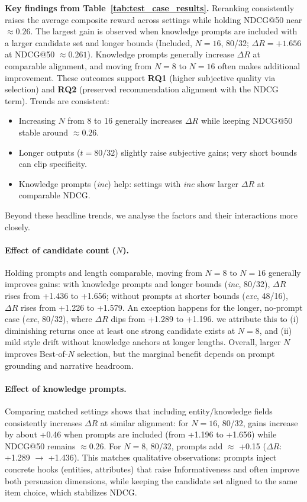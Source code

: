 \documentclass[12pt]{article}
\begin{document}
  \noindent\textbf{Key findings from Table~\ref{tab:test_case_results}.} Reranking consistently raises the average composite reward across settings while holding NDCG@50 near \(\approx 0.26\). The largest gain is observed when knowledge prompts are included with a larger candidate set and longer bounds (Included, $N=16$, 80/32; $\Delta R=+1.656$ at NDCG@50 \(\approx 0.261\)). Knowledge prompts generally increase \(\Delta R\) at comparable alignment, and moving from $N=8$ to $N=16$ often makes additional improvement. These outcomes support \textbf{RQ1} (higher subjective quality via selection) and \textbf{RQ2} (preserved recommendation alignment with the NDCG term).
  \newline
  \newline
  Trends are consistent:
  \begin{itemize}[leftmargin=*]
    \item Increasing $N$ from 8 to 16 generally increases \(\Delta R\) while keeping NDCG@50 stable around \(\approx 0.26\).
    \item Longer outputs ($t=80/32$) slightly raise subjective gains; very short bounds can clip specificity.
    \item Knowledge prompts (\textit{inc}) help: settings with \textit{inc} show larger \(\Delta R\) at comparable NDCG.
  \end{itemize}

  Beyond these headline trends, we analyse the factors and their interactions more closely.

  \paragraph{Effect of candidate count ($N$).} Holding prompts and length comparable, moving from $N=8$ to $N=16$ generally improves gains: with knowledge prompts and longer bounds (\textit{inc}, 80/32), \(\Delta R\) rises from +1.436 to +1.656; without prompts at shorter bounds (\textit{exc}, 48/16), \(\Delta R\) rises from +1.226 to +1.579. An exception happens for the longer, no‑prompt case (\textit{exc}, 80/32), where \(\Delta R\) dips from +1.289 to +1.196. we attribute this to (i) diminishing returns once at least one strong candidate exists at $N=8$, and (ii) mild style drift without knowledge anchors at longer lengths. Overall, larger $N$ improves Best‑of‑$N$ selection, but the marginal benefit depends on prompt grounding and narrative headroom.

  \paragraph{Effect of knowledge prompts.} Comparing matched settings shows that including entity/knowledge fields consistently increases \(\Delta R\) at similar alignment: for $N=16$, 80/32, gains increase by about +0.46 when prompts are included (from +1.196 to +1.656) while NDCG@50 remains \(\approx 0.26\). For $N=8$, 80/32, prompts add \(\approx\) +0.15 ($\Delta R$: +1.289 \(\to\) +1.436). This matches qualitative observations: prompts inject concrete hooks (entities, attributes) that raise Informativeness and often improve both persuasion dimensions, while keeping the candidate set aligned to the same item choice, which stabilizes NDCG.
\end{document}
